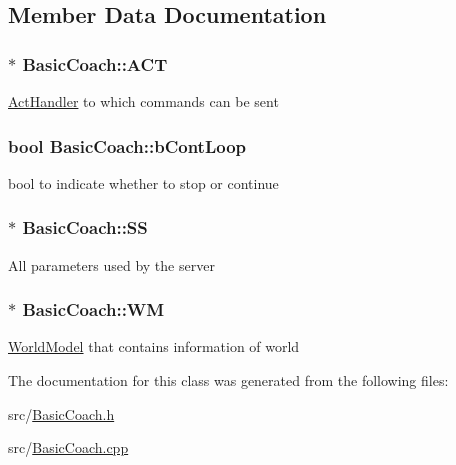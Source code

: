 \subsection{Member Data Documentation}
\subsubsection[{\texorpdfstring{A\+CT}{ACT}}]{$\ast$ Basic\+Coach\+::\+A\+CT\hspace{0.3cm}{\ttfamily [protected]}}\hypertarget{classBasicCoach_a3bbce5d14f0ceb04618a08c8005158fc}{}\label{classBasicCoach_a3bbce5d14f0ceb04618a08c8005158fc}
\hyperlink{classActHandler}{Act\+Handler} to which commands can be sent 
\subsubsection[{\texorpdfstring{b\+Cont\+Loop}{bContLoop}}]{\setlength{\rightskip}{0pt plus 5cm}bool Basic\+Coach\+::b\+Cont\+Loop\hspace{0.3cm}{\ttfamily [protected]}}\hypertarget{classBasicCoach_a0d14913a2364960fdc647dbad35dd71d}{}\label{classBasicCoach_a0d14913a2364960fdc647dbad35dd71d}
bool to indicate whether to stop or continue 
\subsubsection[{\texorpdfstring{SS}{SS}}]{$\ast$ Basic\+Coach\+::\+SS\hspace{0.3cm}{\ttfamily [protected]}}\hypertarget{classBasicCoach_acdde95fc653803caad2630b8d2f9026e}{}\label{classBasicCoach_acdde95fc653803caad2630b8d2f9026e}
All parameters used by the server 
\subsubsection[{\texorpdfstring{WM}{WM}}]{$\ast$ Basic\+Coach\+::\+WM\hspace{0.3cm}{\ttfamily [protected]}}\hypertarget{classBasicCoach_a82f305b964424a2200e875a73871c7fa}{}\label{classBasicCoach_a82f305b964424a2200e875a73871c7fa}
\hyperlink{classWorldModel}{World\+Model} that contains information of world 

The documentation for this class was generated from the following files\+:\begin{DoxyCompactItemize}
\item 
src/\hyperlink{BasicCoach_8h}{Basic\+Coach.\+h}\item 
src/\hyperlink{BasicCoach_8cpp}{Basic\+Coach.\+cpp}\end{DoxyCompactItemize}
